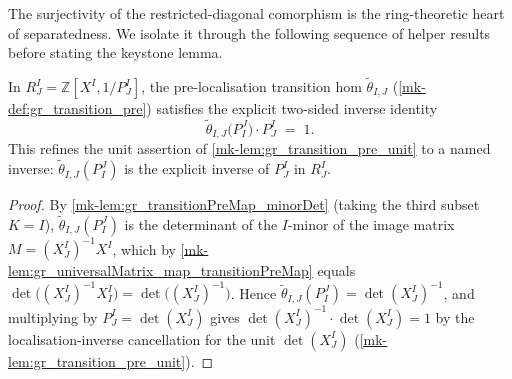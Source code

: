 The surjectivity of the restricted-diagonal comorphism is the ring-theoretic
heart of separatedness. We isolate it through the following sequence of
helper results before stating the keystone lemma.

\begin{lemma}[Two-sided inverse identity \(\tilde\theta_{I,J}(P^J_I)\,P^I_J = 1\)]\label{mk-lem:gr_transitionPreMap_minorDet_swap_mul}
  \leanok

  In \(R^I_J = \mathbb{Z}[X^I, 1/P^I_J]\), the pre-localisation transition hom
  \(\tilde\theta_{I,J}\) (\ref{mk-def:gr_transition_pre}) satisfies the explicit
  two-sided inverse identity
  \[
    \tilde\theta_{I,J}\bigl(P^J_I\bigr) \cdot P^I_J \;=\; 1 .
  \]
  This refines the unit assertion of \ref{mk-lem:gr_transition_pre_unit} to a named
  inverse: \(\tilde\theta_{I,J}(P^J_I)\) is the explicit inverse of \(P^I_J\) in
  \(R^I_J\).
\end{lemma}
\begin{proof}
  \leanok
  By \ref{mk-lem:gr_transitionPreMap_minorDet} (taking the third subset \(K = I\)),
  \(\tilde\theta_{I,J}(P^J_I)\) is the determinant of the \(I\)-minor of the image
  matrix \(M = (X^I_J)^{-1} X^I\), which by
  \ref{mk-lem:gr_universalMatrix_map_transitionPreMap} equals
  \(\det\bigl((X^I_J)^{-1} X^I_I\bigr) = \det\bigl((X^I_J)^{-1}\bigr)\). Hence
  \(\tilde\theta_{I,J}(P^J_I) = \det(X^I_J)^{-1}\), and multiplying by \(P^I_J =
  \det(X^I_J)\) gives \(\det(X^I_J)^{-1} \cdot \det(X^I_J) = 1\) by the
  localisation-inverse cancellation for the unit \(\det(X^I_J)\)
  (\ref{mk-lem:gr_transition_pre_unit}).
\end{proof}

